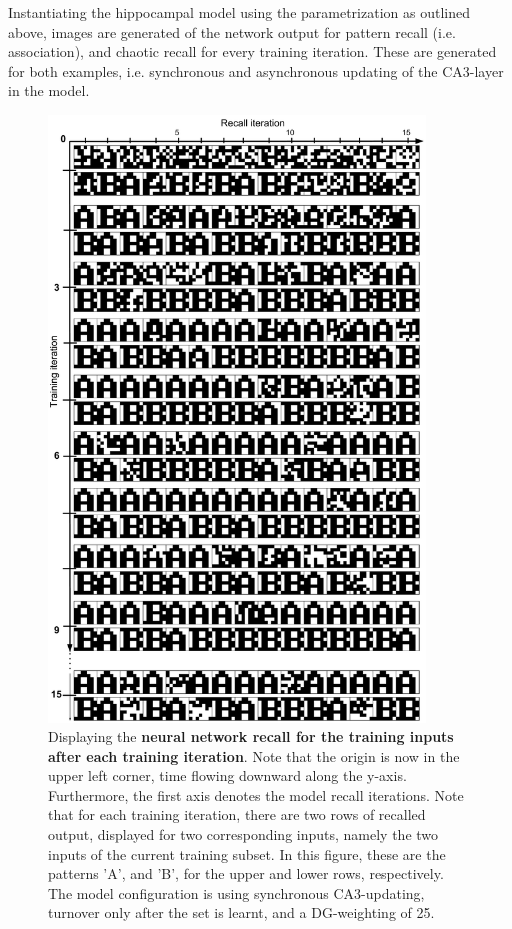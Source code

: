 Instantiating the hippocampal model using the parametrization as outlined above, images are generated of the network output for pattern recall (i.e. association), and chaotic recall for every training iteration. These are generated for both examples, i.e. synchronous and asynchronous updating of the CA3-layer in the model.

\begin{figure}
    \centering
    \includegraphics[width=10cm]{fig/AB-pattern-associations-sync-tm0-dgw25}
    \caption{Displaying the \textbf{neural network recall for the training inputs after each training iteration}. Note that the origin is now in the upper left corner, time flowing downward along the y-axis. Furthermore, the first axis denotes the model recall iterations. Note that for each training iteration, there are two rows of recalled output, displayed for two corresponding inputs, namely the two inputs of the current training subset. In this figure, these are the patterns 'A', and 'B', for the upper and lower rows, respectively. The model configuration is using synchronous CA3-updating, turnover only after the set is learnt, and a DG-weighting of 25.}
    \label{fig:low-level-1}
\end{figure}

